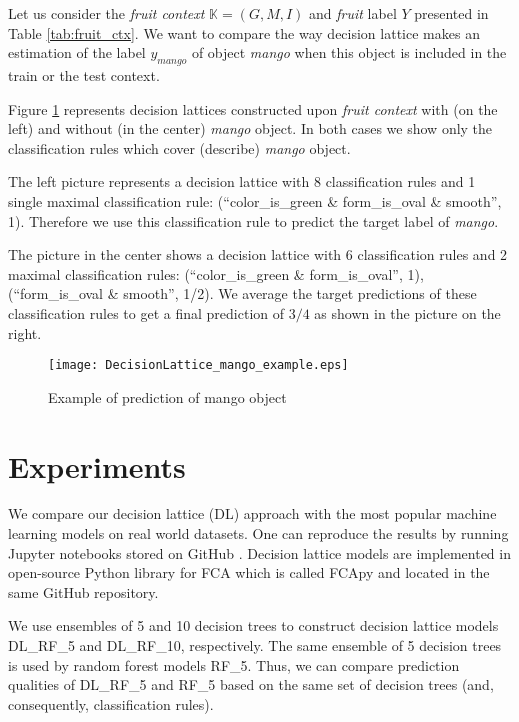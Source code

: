 \documentclass[runningheads]{llncs}
\begin{document}
Let us consider the \emph{fruit context} $\mathbb{K}=(G,M,I)$ and \emph{fruit} label $Y$ presented in Table \ref{tab:fruit_ctx}.
We want to compare the way decision lattice makes an estimation of the label $y_{mango}$ of object \emph{mango} when this object is included in the train or the test context.

Figure \ref{fig_mangolattice} represents decision lattices constructed upon \emph{fruit context} with (on the left) and without (in the center) \emph{mango} object. In both cases we show only the classification rules which cover (describe) \emph{mango} object. 

The left picture represents a decision lattice with 8 classification rules and 1 single maximal classification rule: (``color\_is\_green \& form\_is\_oval \& smooth'', 1). Therefore we use this classification rule to predict the target label of \emph{mango}.

The picture in the center shows a decision lattice with 6 classification rules and 2 maximal classification rules: (``color\_is\_green \& form\_is\_oval'', 1),  \\(``form\_is\_oval \& smooth'', 1/2). We average the target predictions of these classification rules to get a final prediction of $3/4$ as shown in the picture on the right.

\begin{figure}[]
\texttt{[image: DecisionLattice\_mango\_example.eps]}
\caption{Example of prediction of mango object} \label{fig_mangolattice}
\end{figure}

\section{Experiments}

We compare our decision lattice (DL) approach with the most popular %
machine learning models on real world datasets. One can reproduce the results by running Jupyter notebooks stored on GitHub \cite{dl_eval}. Decision lattice models are implemented in open-source Python library for FCA which is called FCApy and located in the same GitHub repository.

We use ensembles of 5 and 10 decision trees to construct decision lattice models DL\_RF\_5 and DL\_RF\_10, respectively. The same ensemble of 5 decision trees is used by random forest models RF\_5. Thus, we can compare prediction qualities of DL\_RF\_5 and RF\_5 based on the same set of decision trees (and, consequently, classification rules).
\end{document}
